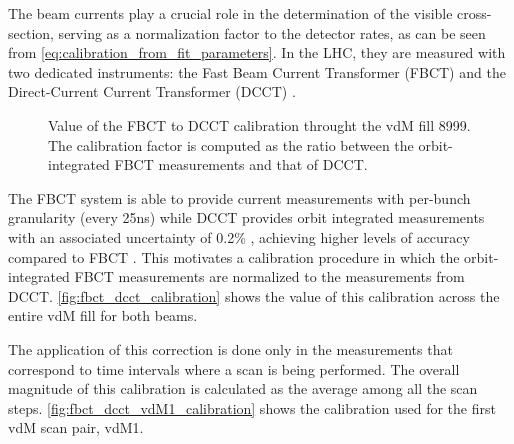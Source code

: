 The beam currents play a crucial role in the determination of the visible cross-section, serving as a normalization factor to the detector rates, as can be seen from \autoref{eq:calibration_from_fit_parameters}. In the LHC, they are measured with two dedicated instruments: the Fast Beam Current Transformer (FBCT) \cite{Belohrad:1267400} and the Direct-Current Current Transformer (DCCT) \cite{Odier:1183400}.

\begin{figure}[!htb]
	\centering
	\caption[FBCT to DCCT calibration]{Value of the FBCT to DCCT calibration throught the vdM fill 8999. The calibration factor is computed as the ratio between the orbit-integrated FBCT measurements and that of DCCT.}
	\label{fig:fbct_dcct_calibration}
\end{figure}

The FBCT system is able to provide current measurements with per-bunch granularity (every 25ns) while DCCT provides orbit integrated measurements with an associated uncertainty of 0.2\% \cite{Barschel:2649533}, achieving higher levels of accuracy compared to FBCT \cite{Gras:1379466}. This motivates a calibration procedure in which the orbit-integrated FBCT measurements are normalized to the measurements from DCCT. \autoref{fig:fbct_dcct_calibration} shows the value of this calibration across the entire vdM fill for both beams.

The application of this correction is done only in the measurements that correspond to time intervals where a scan is being performed. The overall magnitude of this calibration is calculated as the average among all the scan steps. \autoref{fig:fbct_dcct_vdM1_calibration} shows the calibration used for the first vdM scan pair, vdM1.

